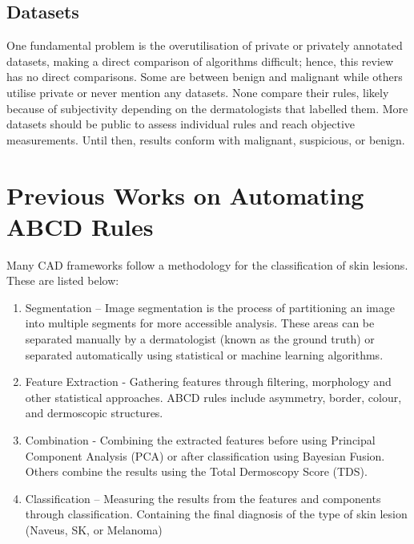 \subsection{Datasets}
One fundamental problem is the overutilisation of private or privately annotated datasets, making a direct comparison of algorithms difficult; hence, this review has no direct comparisons. Some are between benign and malignant\cite{Meskini2018, Kasmi2016, Ali2020b, Ali2020a} while others utilise private or never mention any datasets\cite{Kasmi2016, She2007, Tenenhaus2010, Ramezani2014, Zaqout2016}. None compare their rules, likely because of subjectivity depending on the dermatologists that labelled them. More datasets should be public to assess individual rules and reach objective measurements. Until then, results conform with malignant, suspicious, or benign.

\section{Previous Works on Automating ABCD Rules}
Many CAD frameworks follow a methodology for the classification of skin lesions. These are listed below:

\begin{enumerate}
	
	\item Segmentation – Image segmentation is the process of partitioning an image into multiple segments for more accessible analysis. These areas can be separated manually by a dermatologist (known as the ground truth) or separated automatically using statistical or machine learning algorithms.
	
	\item Feature Extraction - Gathering features through filtering, morphology and other statistical approaches. ABCD rules include asymmetry, border, colour, and dermoscopic structures.

	\item Combination - Combining the extracted features before using Principal Component Analysis (PCA) or after classification using Bayesian Fusion. Others combine the results using the Total Dermoscopy Score (TDS).
	
	\item Classification – Measuring the results from the features and components through classification. Containing the final diagnosis of the type of skin lesion (Naveus, SK, or Melanoma)

\end{enumerate}

